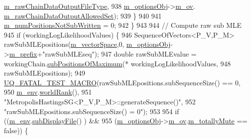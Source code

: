 \begin{DoxyCode}
      \hyperlink{class_q_u_e_s_o_1_1_mh_options_values_ae435f8be38f9f6407a2e0f75c53b4e76}{m\_rawChainDataOutputFileType},
938                                                  \hyperlink{class_q_u_e_s_o_1_1_metropolis_hastings_s_g_a5d0bc9f73d50d272aa6bfb5ef5939ef3}{m\_optionsObj}->\hyperlink{class_q_u_e_s_o_1_1_metropolis_hastings_s_g_options_a9d4792d9fc2dc5439b8ab489b0c236eb}{m\_ov}.
      \hyperlink{class_q_u_e_s_o_1_1_mh_options_values_a99f722385d57bcb24542f3969c3764cd}{m\_rawChainDataOutputAllowedSet});
939       \}
940 
941       \hyperlink{class_q_u_e_s_o_1_1_metropolis_hastings_s_g_a60695940f442f6568d10ee9e456032c7}{m\_numPositionsNotSubWritten} = 0;
942     \}
943 
944     \textcolor{comment}{// Compute raw sub MLE}
945     \textcolor{keywordflow}{if} (workingLogLikelihoodValues) \{
946       SequenceOfVectors<P\_V,P\_M> rawSubMLEpositions(\hyperlink{class_q_u_e_s_o_1_1_metropolis_hastings_s_g_a2ef17fbfc6a156f03bbfad044b5a75f5}{m\_vectorSpace},0,
      \hyperlink{class_q_u_e_s_o_1_1_metropolis_hastings_s_g_a5d0bc9f73d50d272aa6bfb5ef5939ef3}{m\_optionsObj}->\hyperlink{class_q_u_e_s_o_1_1_metropolis_hastings_s_g_options_a4f7c510aaa530336d24259e2a89f5d0b}{m\_prefix}+\textcolor{stringliteral}{"rawSubMLEseq"});
947       \textcolor{keywordtype}{double} rawSubMLEvalue = workingChain.\hyperlink{class_q_u_e_s_o_1_1_base_vector_sequence_a971e9e1a87e4eb47b4910348a6b437d5}{subPositionsOfMaximum}(*
      workingLogLikelihoodValues,
948                                                                  rawSubMLEpositions);
949       \hyperlink{_defines_8h_a56d63d18d0a6d45757de47fcc06f574d}{UQ\_FATAL\_TEST\_MACRO}(rawSubMLEpositions.subSequenceSize() == 0,
950                           \hyperlink{class_q_u_e_s_o_1_1_metropolis_hastings_s_g_ac8ea061e55b920e0c8f9bce5c3f20e52}{m\_env}.\hyperlink{class_q_u_e_s_o_1_1_base_environment_a78b57112bbd0e6dd0e8afec00b40ffa7}{worldRank}(),
951                           \textcolor{stringliteral}{"MetropolisHastingsSG<P\_V,P\_M>::generateSequence()"},
952                           \textcolor{stringliteral}{"rawSubMLEpositions.subSequenceSize() = 0"});
953 
954       \textcolor{keywordflow}{if} ((\hyperlink{class_q_u_e_s_o_1_1_metropolis_hastings_s_g_ac8ea061e55b920e0c8f9bce5c3f20e52}{m\_env}.\hyperlink{class_q_u_e_s_o_1_1_base_environment_a8a0064746ae8dddfece4229b9ad374d6}{subDisplayFile}()                   ) &&
955           (\hyperlink{class_q_u_e_s_o_1_1_metropolis_hastings_s_g_a5d0bc9f73d50d272aa6bfb5ef5939ef3}{m\_optionsObj}->\hyperlink{class_q_u_e_s_o_1_1_metropolis_hastings_s_g_options_a9d4792d9fc2dc5439b8ab489b0c236eb}{m\_ov}.\hyperlink{class_q_u_e_s_o_1_1_mh_options_values_af812309e81191e88dfdc87c5815141a3}{m\_totallyMute} == \textcolor{keyword}{false})) \{

\end{DoxyCode}
